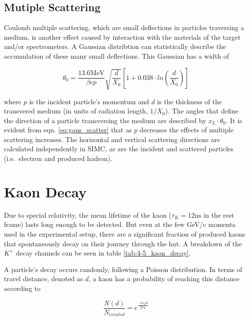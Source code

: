 \documentclass[
]{report}
\begin{document}
\hypertarget{mutiple-scattering}{%
\subsection{Mutiple Scattering}\label{mutiple-scattering}}

Coulomb multiple scattering, which are small deflections in particles
traversing a medium, is another effect caused by interaction with the
materials of the target and/or spectrometers. A Gaussian distribtion can
statistically describe the accumulation of these many small deflections.
This Gaussian has a width of

\begin{equation} 
  \theta_0=\frac{13.6 \text{MeV}}{\beta cp}\sqrt{\frac{d}{X_0}}[1+0.038\cdot ln(\frac{d}{X_0})]
  \label{eq:gaus_scatter} 
\end{equation}

\noindent where \(p\) is the incident particle's momentum and \(d\) is
the thickness of the transvered medium (in units of radiation length,
\(1/X_0\)). The angles that define the direction of a particle
transversing the medium are described by \(x_L\cdot\theta_0\). It is
evident from eqn. \ref{eq:gaus_scatter} that as \(p\) decreases the
effects of multiple scattering increases. The horizontal and vertical
scattering directions are calculated independently in SIMC, as are the
incident and scattered particles (i.e.~electron and produced hadron).

\hypertarget{Section-6.5}{%
\section{Kaon Decay}\label{Section-6.5}}



Due to special relativity, the mean lifetime of the kaon
(\(\tau_K=12\text{ns}\) in the rest frame) lasts long enough to be
detected. But even at the few GeV/c momenta used in the experimental
setup, there are a significant fraction of produced kaons that
spontaneously decay on their journey through the hut. A breakdown of the
\(K^+\) decay channels can be seen in table \ref{tab:4-5_kaon_decay}.

A particle's decay occurs randomly, following a Poisson distribution. In
terms of travel distance, denoted as \(d\), a kaon has a probability of
reaching this distance according to

\begin{equation} 
  \frac{N(d)}{N_{created}}=e^{\frac{-m_Kd}{p\tau_K}}
  \label{eq:kaon_decay} 
\end{equation}
\end{document}
